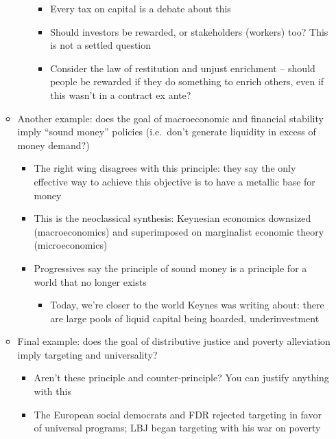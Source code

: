 \begin{itemize}
\begin{itemize}
\begin{itemize}
      \begin{itemize}
      \tightlist
      \item
        Every tax on capital is a debate about this
      \item
        Should investors be rewarded, or stakeholders (workers) too?
        This is not a settled question
      \item
        Consider the law of restitution and unjust enrichment -- should
        people be rewarded if they do something to enrich others, even
        if this wasn't in a contract ex ante?
      \end{itemize}
    \end{itemize}
  \item
    Another example: does the goal of macroeconomic and financial
    stability imply ``sound money'' policies (i.e.~don't generate
    liquidity in excess of money demand?)

    \begin{itemize}
    \tightlist
    \item
      The right wing disagrees with this principle: they say the only
      effective way to achieve this objective is to have a metallic base
      for money
    \item
      This is the neoclassical synthesis: Keynesian economics downsized
      (macroeconomics) and superimposed on marginalist economic theory
      (microeconomics)
    \item
      Progressives say the principle of sound money is a principle for a
      world that no longer exists

      \begin{itemize}
      \tightlist
      \item
        Today, we're closer to the world Keynes was writing about: there
        are large pools of liquid capital being hoarded, underinvestment
      \end{itemize}
    \end{itemize}
  \item
    Final example: does the goal of distributive justice and poverty
    alleviation imply targeting and universality?

    \begin{itemize}
    \tightlist
    \item
      Aren't these principle and counter-principle? You can justify
      anything with this
    \item
      The European social democrats and FDR rejected targeting in favor
      of universal programs; LBJ began targeting with his war on poverty


\end{itemize}
\end{itemize}
\end{itemize}
